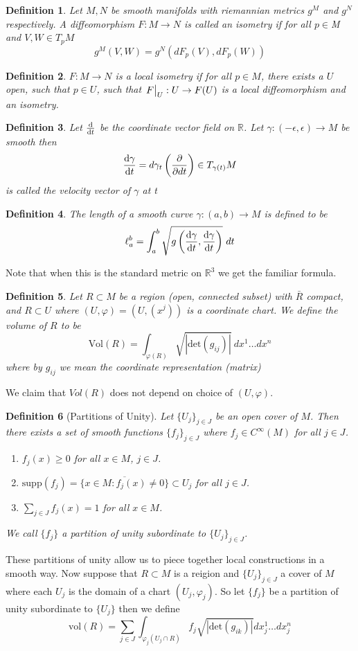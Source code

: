 \documentclass[a4paper]{article}
\newtheorem*{defn}{Definition}
\begin{document}
\begin{defn}
  Let $M,N$ be smooth manifolds with riemannian metrics $g^M$ and $g^N$ respectively. A diffeomorphism $F:M \rightarrow N$ is called an isometry if for all $p \in $M and $V,W \in T_pM$
  \[
    g^M(V,W) = g^N(dF_p(V), dF_p(W))
  \]
\end{defn}

\begin{defn}
  $F:M \rightarrow N$ is a local isometry if for all $p \in M$, there exists a $U$ open, such that $p \in U$, such that $\eval{F}_U: U \rightarrow F(U)$ is a local diffeomorphism and an isometry.
\end{defn}

\begin{defn}
  Let $\dv{}{t}$ be the coordinate vector field on $\mathds{R}$. Let $\gamma:(-\epsilon, \epsilon) \rightarrow M$ be smooth then 
  \[
    \dv{\gamma}{t} = d\gamma_t\left(\pdv{}{dt}\right) \in T_{\gamma(t)}M
  \]
  is called the velocity vector of $\gamma$ at t
\end{defn}

\begin{defn}
  The length of a smooth curve $\gamma: (a,b) \rightarrow M$ is defined to be
  \[
    \ell_a^b = \int_{a}^b \sqrt{g\left(\dv{\gamma}{t}, \dv{\gamma}{t}\right)}\ dt
  \]
\end{defn}
Note that when this is the standard metric on $\mathds{R}^3$ we get the familiar formula.

\begin{defn}
  Let $R \subset M$ be a region (open, connected subset) with $\bar{R}$ compact, and $R \subset U$ where $(U, \varphi) = (U, (x^j))$ is a coordinate chart. We define the volume of $R$ to be 
  \[
    \text{Vol}(R) = \int_{\varphi(R)} \sqrt{|\text{det}(g_{ij})|}\ dx^1 \dots dx^n
  \]
  where by $g_{ij}$ we mean the coordinate representation (matrix)
\end{defn}
We claim that $Vol(R)$ does not depend on choice of $(U, \varphi)$.

\begin{defn}[Partitions of Unity]
  Let $\{U_j\}_{j\in J}$ be an open cover of $M$. Then there exists a set of smooth functions $\{f_j\}_{j \in J}$ where $f_j \in C^{\infty}(M)$ for all $j \in J$. 
  \begin{enumerate}
    \item $f_j(x) \geq 0$ for all $x\in M$, $j \in J$.
    \item $\text{supp}(f_j) = \overline{\{x \in M: f_j(x) \neq 0\}} \subset U_j$ for all $j \in J$.
    \item $\sum_{j \in J}f_j(x) = 1$ for all $x \in M$.
  \end{enumerate}
  We call $\{f_j\}$ a partition of unity subordinate to $\{U_j\}_{j \in J}$.
\end{defn}
These partitions of unity allow us to piece together local constructions in a smooth way. Now suppose that $R \subset M$ is a reigion and $\{U_j\}_{j\in J}$ a cover of $M$ where each $U_j$ is the domain of a chart $(U_j, \varphi_j)$. So let $\{f_j\}$ be a partition of unity subordinate to $\{U_j\}$ then we define
\[
  \text{vol}(R) = \sum_{j\in J} \int_{\varphi_j(U_j \cap R)} f_j \sqrt{|\text{det}(g_{ik})|} dx_j^1 \dots dx_j^n
\]
\end{document}
